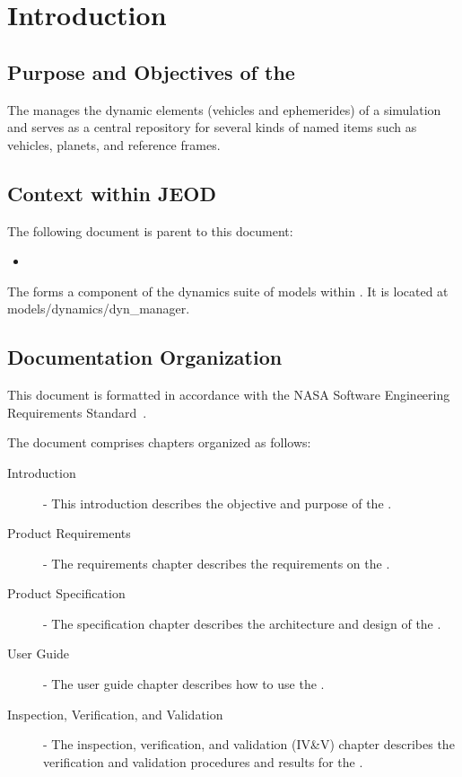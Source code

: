 %
%
\chapter{Introduction}
\label{ch:intro}

\section{Purpose and Objectives of the \ModelDesc}
The \ModelDesc manages the dynamic elements (vehicles and ephemerides)
of a simulation and serves as a central repository for several kinds of
named items such as vehicles, planets, and reference frames.

\section{Context within JEOD}
The following document is parent to this document:
\begin{itemize}
\item \hyperJEOD
\end{itemize}

The \ModelDesc forms a component of the dynamics suite of
models within \JEODid. It is located at
models/dynamics/dyn\_manager.





\section{Documentation Organization}
This document is formatted in accordance with the 
NASA Software Engineering Requirements Standard~\cite{NASA:SWE}.

The document comprises chapters organized as follows:

\begin{description}
\item[Introduction] - 
This introduction describes the objective and purpose of the \ModelDesc.

\item[Product Requirements] -
The requirements chapter describes the requirements on the \ModelDesc.

\item[Product Specification] -
The specification chapter describes
the architecture and design of the \ModelDesc.

\item[User Guide] -
The user guide chapter describes
how to use the \ModelDesc.
 
\item[Inspection, Verification, and Validation] -
The inspection, verification, and validation (IV\&V) chapter describes
the verification and validation procedures and results for the \ModelDesc.
\end{description}
